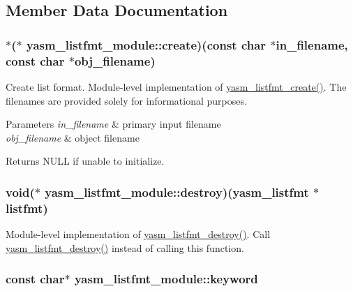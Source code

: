 \subsection{Member Data Documentation}
\hypertarget{structyasm__listfmt__module_a8625c26e2d4c39e71383f57fda39c0b8}{
\subsubsection[{create}]{$\ast$($\ast$ yasm\-\_\-listfmt\-\_\-module\-::create)(const char $\ast$in\-\_\-filename, const char $\ast$obj\-\_\-filename)}}\label{structyasm__listfmt__module_a8625c26e2d4c39e71383f57fda39c0b8}
Create list format. Module-\/level implementation of \hyperlink{listfmt_8h_aba521a013b01741868dc31754b1560a8}{yasm\-\_\-listfmt\-\_\-create()}. The filenames are provided solely for informational purposes. 
\begin{DoxyParams}{Parameters}
{\em in\-\_\-filename} & primary input filename \\
\hline
{\em obj\-\_\-filename} & object filename \\
\hline
\end{DoxyParams}
\begin{DoxyReturn}{Returns}
N\-U\-L\-L if unable to initialize. 
\end{DoxyReturn}
\hypertarget{structyasm__listfmt__module_a75c3694c69440c85582d0100d198fee7}{
\subsubsection[{destroy}]{\setlength{\rightskip}{0pt plus 5cm}void($\ast$ yasm\-\_\-listfmt\-\_\-module\-::destroy)({\bf yasm\-\_\-listfmt} $\ast$listfmt)}}\label{structyasm__listfmt__module_a75c3694c69440c85582d0100d198fee7}
Module-\/level implementation of \hyperlink{listfmt_8h_a8f8a4e618a10cdacf8ab094b68fd27cc}{yasm\-\_\-listfmt\-\_\-destroy()}. Call \hyperlink{listfmt_8h_a8f8a4e618a10cdacf8ab094b68fd27cc}{yasm\-\_\-listfmt\-\_\-destroy()} instead of calling this function. \hypertarget{structyasm__listfmt__module_a3ce0f3e953d23dce48ed848a910385cf}{
\subsubsection[{keyword}]{\setlength{\rightskip}{0pt plus 5cm}const char$\ast$ yasm\-\_\-listfmt\-\_\-module\-::keyword}}\label{structyasm__listfmt__module_a3ce0f3e953d23dce48ed848a910385cf}
